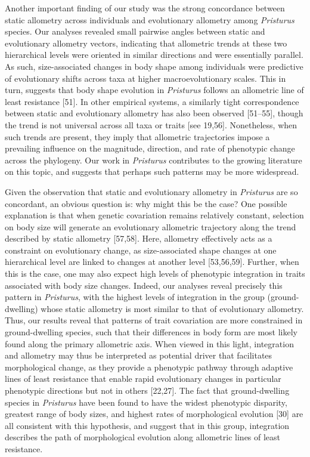 \documentclass[
  11pt,
]{article}
\begin{document}
Another important finding of our study was the strong concordance
between static allometry across individuals and evolutionary allometry
among \emph{Pristurus} species. Our analyses revealed small pairwise
angles between static and evolutionary allometry vectors, indicating
that allometric trends at these two hierarchical levels were oriented in
similar directions and were essentially parallel. As such,
size-associated changes in body shape among individuals were predictive
of evolutionary shifts across taxa at higher macroevolutionary scales.
This in turn, suggests that body shape evolution in \emph{Pristurus}
follows an allometric line of least resistance {[}51{]}. In other
empirical systems, a similarly tight correspondence between static and
evolutionary allometry has also been observed {[}51--55{]}, though the
trend is not universal across all taxa or traits {[}see 19,56{]}.
Nonetheless, when such trends are present, they imply that allometric
trajectories impose a prevailing influence on the magnitude, direction,
and rate of phenotypic change across the phylogeny. Our work in
\emph{Pristurus} contributes to the growing literature on this topic,
and suggests that perhaps such patterns may be more
widespread.\hfill\break

Given the observation that static and evolutionary allometry in
\emph{Pristurus} are so concordant, an obvious question is: why might
this be the case? One possible explanation is that when genetic
covariation remains relatively constant, selection on body size will
generate an evolutionary allometric trajectory along the trend described
by static allometry {[}57,58{]}. Here, allometry effectively acts as a
constraint on evolutionary change, as size-associated shape changes at
one hierarchical level are linked to changes at another level
{[}53,56,59{]}. Further, when this is the case, one may also expect high
levels of phenotypic integration in traits associated with body size
changes. Indeed, our analyses reveal precisely this pattern in
\emph{Pristurus}, with the highest levels of integration in the group
(ground-dwelling) whose static allometry is most similar to that of
evolutionary allometry. Thus, our results reveal that patterns of trait
covariation are more constrained in ground-dwelling species, such that
their differences in body form are most likely found along the primary
allometric axis. When viewed in this light, integration and allometry
may thus be interpreted as potential driver that facilitates
morphological change, as they provide a phenotypic pathway through
adaptive lines of least resistance that enable rapid evolutionary
changes in particular phenotypic directions but not in others
{[}22,27{]}. The fact that ground-dwelling species in \emph{Pristurus}
have been found to have the widest phenotypic disparity, greatest range
of body sizes, and highest rates of morphological evolution {[}30{]} are
all consistent with this hypothesis, and suggest that in this group,
integration describes the path of morphological evolution along
allometric lines of least resistance. \hfill\break
\end{document}
